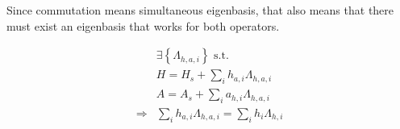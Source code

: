 \begin{answer}
\begin{answerpart}{\ctrois{}}
    Since commutation means simultaneous eigenbasis, that also means
    that there must exist an eigenbasis that works for both operators.

    \begin{equation}
      \begin{split}
        &\exists \left\{\Lambda_{h,a,i}\right\} \text{ s.t.}\\
        & H = H_s + \sum_i h_{a,i}\Lambda_{h,a,i}\\
        & A = A_s + \sum_i a_{h,i}\Lambda_{h,a,i}\\
        \Rightarrow & \sum_i h_{a,i}\Lambda_{h,a,i} = \sum_i h_{i}\Lambda_{h,i}\\
      \end{split}
    \end{equation}


    

    

\end{answerpart}
\end{answer}
